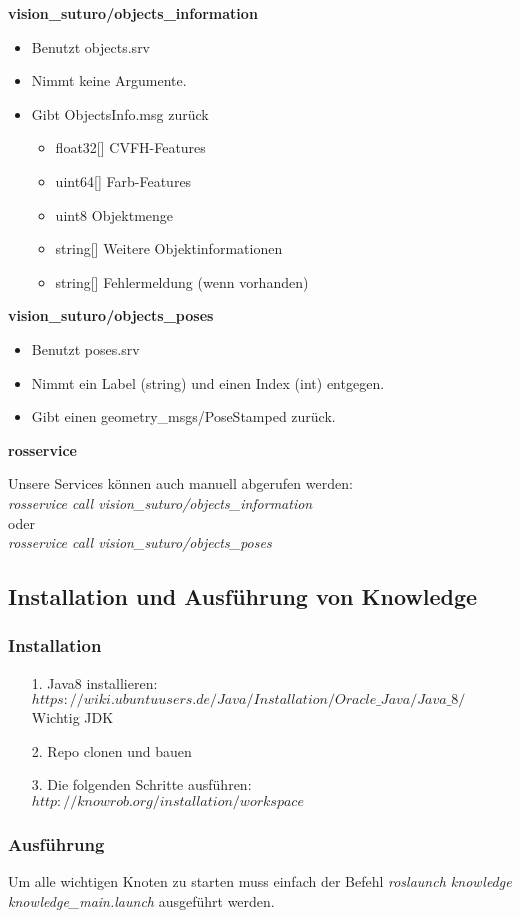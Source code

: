 \documentclass{suturo}
\begin{document}
\textbf{vision\_suturo/objects\_information}
\begin{itemize}
\item Benutzt objects.srv
\item Nimmt keine Argumente.
\item Gibt ObjectsInfo.msg zurück
\begin{itemize}
\item float32[] CVFH-Features
\item uint64[] Farb-Features
\item uint8 Objektmenge
\item string[] Weitere Objektinformationen
\item string[] Fehlermeldung (wenn vorhanden)
\end{itemize}
\end{itemize}
\textbf{vision\_suturo/objects\_poses}
\begin{itemize}
\item Benutzt poses.srv
\item Nimmt ein Label (string) und einen Index (int) entgegen.
\item Gibt einen geometry\_msgs/PoseStamped zurück.
\end{itemize}

\textbf{rosservice}

Unsere Services k\"onnen auch manuell abgerufen werden: \\

\textit{rosservice call vision\_suturo/objects\_information} \\

oder \\

\textit{rosservice call vision\_suturo/objects\_poses}

\subsection{Installation und Ausführung von Knowledge}

\subsubsection{Installation}

\begin{itemize}
\item[1.] Java8 installieren:\\
$ https://wiki.ubuntuusers.de/Java/Installation/Oracle\_Java/Java\_8/ $\\
Wichtig JDK
\item[2.] Repo clonen und bauen
\item[3.] Die folgenden Schritte ausführen: $http://knowrob.org/installation/workspace$
\end{itemize}

\subsubsection{Ausführung}

Um alle wichtigen Knoten zu starten muss einfach der Befehl \textit{roslaunch knowledge knowledge\_main.launch} ausgeführt werden.
\end{document}
